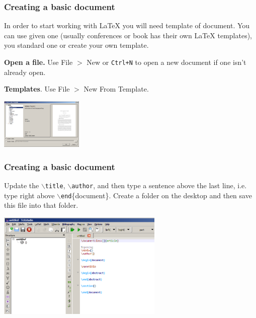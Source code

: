 \documentclass[slidestop,compress,mathserif]{beamer}
\begin{document}
\begin{frame} \frametitle{Creating a basic document}
	
	In order to start working with LaTeX you will need template of document. You can use given one (usually conferences or book has their own LaTeX templates), you standard one or create your own template.\\
	
	\vspace{0.5cm}
		
	{\bf Open a file.}  Use {\color{highlight}File $>$ New} or \texttt{\color{highlight}Ctrl+N}  to open a new document if one isn't already open. \\

	\vspace{0.5cm}

	{\bf Templates}. Use {\color{highlight} File $>$ New From Template}. \\
	\begin{center}
		\includegraphics[height=0.95in]{basicsOfLatex/gettingStarted/texstudioTemplate}
	\end{center}
\end{frame}

\begin{frame} \frametitle{Creating a basic document}
Update the \texttt{\color{command}$\backslash$title}, \texttt{\color{command}$\backslash$author}, and then type a sentence above the last line, i.e. type right above \texttt{\color{command}$\backslash$end}{\color{braces}\{}document{\color{braces}\}}. Create a folder on the desktop and then save this file into that folder.
	\begin{center}
		\includegraphics[height=2.0in]{basicsOfLatex/gettingStarted/texstudioFirstDocument}
	\end{center}
\end{frame}
\end{document}
